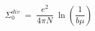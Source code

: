 \begin{equation}\label{eq:ct}
\Sigma_0^{div} \;=\; \frac{e^2}{4 \pi N} \; \ln(\frac{1}{b\mu})
\end{equation}

